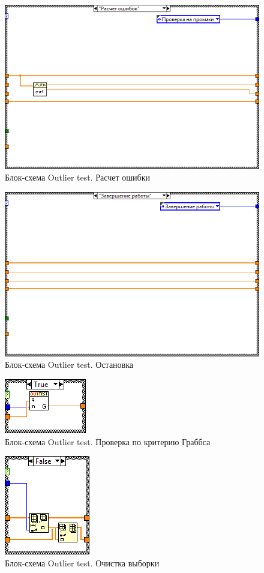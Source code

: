\documentclass[a4paper,14pt]{article}
\begin{document}
\begin{figure}[H]
    \centering
    \includegraphics[width=0.5\linewidth]{image/ot_schema_err}
    \caption{Блок-схема Outlier test. Расчет ошибки}\label{img:ot_schema_err}
\end{figure}
\begin{figure}[H]
    \centering
    \includegraphics[width=0.5\linewidth]{image/ot_schema_stop}
    \caption{Блок-схема Outlier test. Остановка}\label{img:ot_schema_stop}
\end{figure}
\begin{figure}[H]
    \centering
    \includegraphics[width=0.3\linewidth]{image/ot_schema_grubbs}
    \caption{Блок-схема Outlier test. Проверка по критерию Граббса}\label{img:ot_schema_grubbs}
\end{figure}

\begin{figure}[H]
    \centering
    \includegraphics[width=0.3\linewidth]{image/ot_schema_remove}
    \caption{Блок-схема Outlier test. Очистка выборки}\label{img:ot_schema_remove}
\end{figure}
\end{document}
